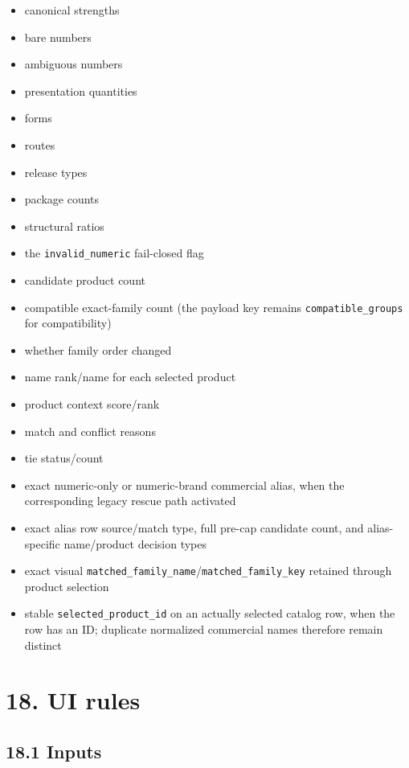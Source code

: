 \begin{itemize}
\tightlist
\item
  canonical strengths
\item
  bare numbers
\item
  ambiguous numbers
\item
  presentation quantities
\item
  forms
\item
  routes
\item
  release types
\item
  package counts
\item
  structural ratios
\item
  the \texttt{invalid\_\allowbreak{}numeric} fail-closed flag
\item
  candidate product count
\item
  compatible exact-family count (the payload key remains \texttt{compatible\_\allowbreak{}groups} for compatibility)
\item
  whether family order changed
\item
  name rank/name for each selected product
\item
  product context score/rank
\item
  match and conflict reasons
\item
  tie status/count
\item
  exact numeric-only or numeric-brand commercial alias, when the corresponding legacy rescue path activated
\item
  exact alias row source/match type, full pre-cap candidate count, and alias-specific name/product decision types
\item
  exact visual \texttt{matched\_\allowbreak{}family\_\allowbreak{}name}/\texttt{matched\_\allowbreak{}family\_\allowbreak{}key} retained through product selection
\item
  stable \texttt{selected\_\allowbreak{}product\_\allowbreak{}id} on an actually selected catalog row, when the row has an ID; duplicate normalized commercial names therefore remain distinct
\end{itemize}

\section{18. UI rules}\label{18-ui-rules}

\subsection{18.1 Inputs}\label{181-inputs}

